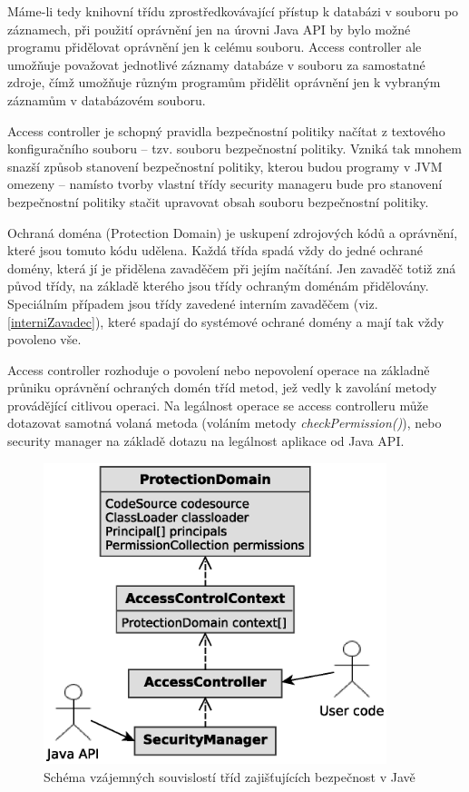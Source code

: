Máme-li tedy knihovní třídu zprostředkovávající přístup k databázi v souboru po záznamech, při použití oprávnění jen na úrovni Java API by bylo možné programu přidělovat oprávnění jen k celému souboru. Access controller ale umožňuje považovat jednotlivé záznamy databáze v souboru za samostatné zdroje, čímž umožňuje různým programům přidělit oprávnění jen k vybraným záznamům v databázovém souboru.

Access controller je schopný pravidla bezpečnostní politiky načítat z textového konfiguračního souboru -- tzv. souboru bezpečnostní politiky. Vzniká tak mnohem snazší způsob stanovení bezpečnostní politiky, kterou budou programy v JVM omezeny -- namísto tvorby vlastní třídy security manageru bude pro stanovení bezpečnostní politiky stačit upravovat obsah souboru bezpečnostní politiky. \cite[5]{oaks}

Ochraná doména (Protection Domain) je uskupení zdrojových kódů a oprávnění, které jsou tomuto kódu udělena. Každá třída spadá vždy do jedné ochrané domény, která jí je přidělena zavaděčem při jejím načítání. Jen zavaděč totiž zná původ třídy, na základě kterého jsou třídy ochraným doménám přidělovány. Speciálním případem jsou třídy zavedené interním zavaděčem (viz. \ref{interniZavadec}), které spadají do systémové ochrané domény a mají tak vždy povoleno vše. \cite[5.4]{oaks}

Access controller rozhoduje o povolení nebo nepovolení operace na základně průniku oprávnění ochraných domén tříd metod, jež vedly k zavolání metody provádějící citlivou operaci. Na legálnost operace se access controlleru může dotazovat samotná volaná metoda (voláním metody {\it checkPermission()}), nebo security manager na základě dotazu na legálnost aplikace od Java API.

\begin{figure}[ht]
  \centering
  \includegraphics[width=10cm]{fig/security-schema}
  \caption{Schéma vzájemných souvislostí tříd zajišťujících bezpečnost v Javě}
\end{figure}

